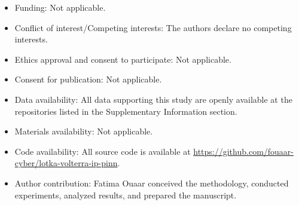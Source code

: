 \documentclass[pdflatex,sn-mathphys-num]{sn-jnl}
\theoremstyle{thmstyleone}%
\theoremstyle{thmstyletwo}%
\theoremstyle{thmstylethree}%
\begin{document}
	
	\begin{itemize}
		\item Funding: Not applicable.
		\item Conflict of interest/Competing interests: The authors declare no competing interests.
		\item Ethics approval and consent to participate: Not applicable.
		\item Consent for publication: Not applicable.
		\item Data availability: All data supporting this study are openly available at the repositories listed in the Supplementary Information section.
		\item Materials availability: Not applicable.
		\item Code availability: All source code is available at \url{https://github.com/fouaar-cyber/lotka-volterra-ip-pinn}.
		\item Author contribution: Fatima Ouaar conceived the methodology, conducted experiments, analyzed results, and prepared the manuscript.
	\end{itemize}
	
\end{document}
